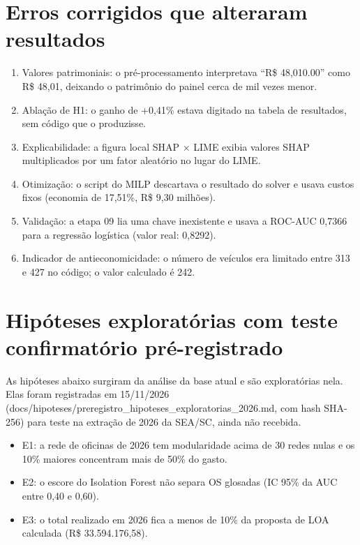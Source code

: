 \section{Erros corrigidos que alteraram resultados}
\begin{enumerate}
\item Valores patrimoniais: o pré-processamento interpretava “R\$ 48,010.00” como R\$ 48,01, deixando o patrimônio do painel cerca de mil vezes menor.
\item Ablação de H1: o ganho de +0,41\% estava digitado na tabela de resultados, sem código que o produzisse.
\item Explicabilidade: a figura local SHAP $\times$ LIME exibia valores SHAP multiplicados por um fator aleatório no lugar do LIME.
\item Otimização: o script do MILP descartava o resultado do solver e usava custos fixos (economia de 17,51\%, R\$ 9,30 milhões).
\item Validação: a etapa 09 lia uma chave inexistente e usava a ROC-AUC 0,7366 para a regressão logística (valor real: 0,8292).
\item Indicador de antieconomicidade: o número de veículos era limitado entre 313 e 427 no código; o valor calculado é 242.
\end{enumerate}

\section{Hipóteses exploratórias com teste confirmatório pré-registrado}
As hipóteses abaixo surgiram da análise da base atual e são exploratórias nela. Elas foram registradas em 15/11/2026 (docs/hipoteses/preregistro\_hipoteses\_exploratorias\_2026.md, com hash SHA-256) para teste na extração de 2026 da SEA/SC, ainda não recebida.
\begin{itemize}
\item E1: a rede de oficinas de 2026 tem modularidade acima de 30 redes nulas e os 10\% maiores concentram mais de 50\% do gasto.
\item E2: o escore do Isolation Forest não separa OS glosadas (IC 95\% da AUC entre 0,40 e 0,60).
\item E3: o total realizado em 2026 fica a menos de 10\% da proposta de LOA calculada (R\$ 33.594.176,58).
\end{itemize}
